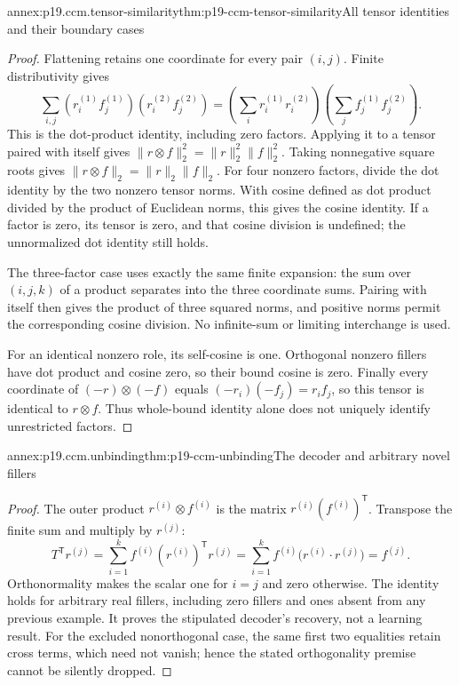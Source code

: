 \begin{annexitem}{annex:p19.ccm.tensor-similarity}{thm:p19-ccm-tensor-similarity}{All tensor identities and their boundary cases}
\begin{proof}
Flattening retains one coordinate for every pair \((i,j)\).
Finite distributivity gives
\[
 \sum_{i,j}(r_i^{(1)}f_j^{(1)})(r_i^{(2)}f_j^{(2)})
 =\left(\sum_i r_i^{(1)}r_i^{(2)}\right)
  \left(\sum_j f_j^{(1)}f_j^{(2)}\right).
\]
This is the dot-product identity, including zero factors.
Applying it to a tensor paired with itself gives
\(\|r\otimes f\|_2^2=\|r\|_2^2\|f\|_2^2\).
Taking nonnegative square roots gives
\(\|r\otimes f\|_2=\|r\|_2\|f\|_2\).
For four nonzero factors, divide the dot identity by the two
nonzero tensor norms. With cosine defined as dot product divided
by the product of Euclidean norms, this gives the cosine identity.
If a factor is zero, its tensor is zero, and that cosine division
is undefined; the unnormalized dot identity still holds.

The three-factor case uses exactly the same finite expansion:
the sum over \((i,j,k)\) of a product separates into the three
coordinate sums. Pairing with itself then gives the product of
three squared norms, and positive norms permit the corresponding
cosine division. No infinite-sum or limiting interchange is used.

For an identical nonzero role, its self-cosine is one. Orthogonal
nonzero fillers have dot product and cosine zero, so their bound
cosine is zero. Finally every coordinate of
\((-r)\otimes(-f)\) equals \((-r_i)(-f_j)=r_i f_j\), so
this tensor is identical to \(r\otimes f\). Thus whole-bound
identity alone does not uniquely identify unrestricted factors.
\end{proof}
\end{annexitem}

\begin{annexitem}{annex:p19.ccm.unbinding}{thm:p19-ccm-unbinding}{The decoder and arbitrary novel fillers}
\begin{proof}
The outer product \(r^{(i)}\otimes f^{(i)}\) is the matrix
\(r^{(i)}(f^{(i)})^{\mathsf T}\). Transpose the finite sum and
multiply by \(r^{(j)}\):
\[
 T^{\mathsf T}r^{(j)}
 =\sum_{i=1}^k f^{(i)}(r^{(i)})^{\mathsf T}r^{(j)}
 =\sum_{i=1}^k f^{(i)}\bigl(r^{(i)}\cdot r^{(j)}\bigr)
 =f^{(j)}.
\]
Orthonormality makes the scalar one for \(i=j\) and zero
otherwise. The identity holds for arbitrary real fillers,
including zero fillers and ones absent from any previous example.
It proves the stipulated decoder's recovery, not a learning result.
For the excluded nonorthogonal case, the same first two equalities
retain cross terms, which need not vanish; hence the stated
orthogonality premise cannot be silently dropped.
\end{proof}
\end{annexitem}
